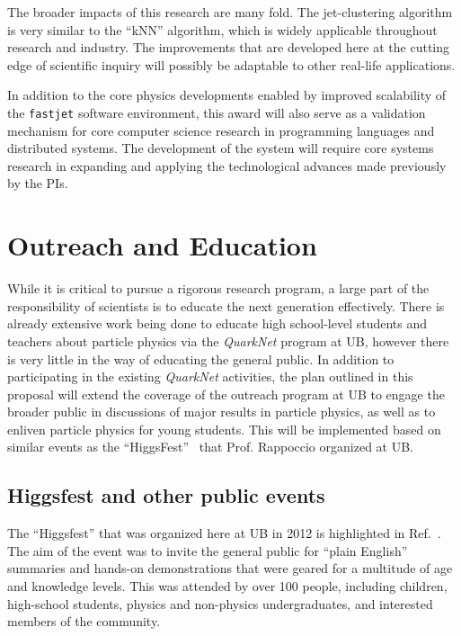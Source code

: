 \documentclass[times,11pt]{article}
\begin{document}
The broader impacts of this research are many fold. The jet-clustering
algorithm is very similar to the ``kNN'' algorithm, which is widely
applicable throughout research and industry. The improvements that are
developed here at the cutting edge of scientific inquiry will possibly be
adaptable to other real-life applications. 

In addition to the core physics developments enabled by improved
scalability of the {\tt fastjet} software environment, this award will
also serve as a validation mechanism for core computer science
research in programming languages and distributed systems.  The development
of the system will require core systems research in expanding and applying
the technological advances made previously by the PIs.



\section{Outreach and Education}

While it is critical to pursue a rigorous research program, a large
part of the responsibility of scientists is to educate the next
generation effectively. There is already extensive work being done to
educate high school-level students and teachers about particle physics
via the {\em QuarkNet}
program  at UB, however there is
very little in the way of educating the general
public. 
In addition to participating in the existing {\em QuarkNet}
activities, the plan outlined in this proposal will extend the coverage of the
outreach program at UB to engage the broader
public in discussions of major results in particle
physics, as well as to enliven particle physics for young students. 
This will be implemented based on similar events as the
``HiggsFest''~\cite{higgsfest} that Prof. Rappoccio organized at UB. 


\subsection{Higgsfest and other public events}

The ``Higgsfest'' that was organized here at UB in 2012
is highlighted in Ref.~\cite{higgsfest}. The aim of the event was to
invite the general public for ``plain English'' summaries and hands-on
demonstrations that were geared for a multitude of age and knowledge
levels. 
This was attended by over 100 people, including children,
high-school students, physics and non-physics undergraduates, and
interested members of the community. 
\end{document}
